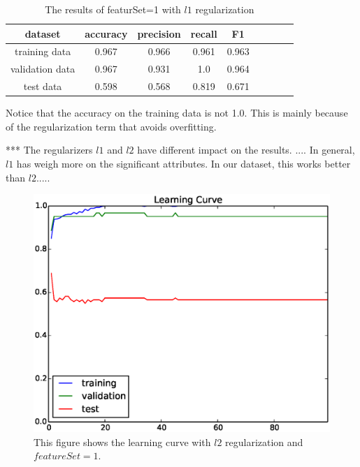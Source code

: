 \begin{table}[htb]
  \begin{center}
  \begin{tabular}{|c|c|c|c|c|c|c|c|c|} \hline
    dataset & accuracy & precision & recall & F1 \\ \hline
    training data & 0.967 & 0.966 & 0.961 & 0.963 \\ \hline
    validation data & 0.967 & 0.931 & 1.0 & 0.964 \\ \hline
    test data & 0.598 & 0.568 & 0.819 & 0.671 \\ \hline
  \end{tabular}
  \caption{The results of featurSet=1 with $l1$ regularization}
  \label{tab:result_1_l2}
  \end{center}
\end{table}

Notice that the accuracy on the training data is not 1.0. This is mainly because of the regularization term that avoids overfitting.

*** The regularizers $l1$ and $l2$ have different impact on the results. ....
In general, $l1$ has weigh more on the significant attributes. In our dataset, this works better than $l2$.....



\begin{figure}[hbtp]
\centering
\includegraphics[width=140mm]{learning_curve_l2_1}
\caption{This figure shows the learning curve with $l2$ regularization and $featureSet=1$.}
\label{fig:learning_curve_l2_1}
\end{figure}



